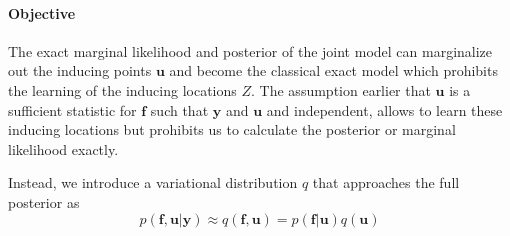 \documentclass[5p,11pt]{article}
\begin{document}
\paragraph{Objective} The exact marginal likelihood and posterior of the joint model can marginalize out the inducing points $\bm{u}$ and become the classical exact model which prohibits the learning of the inducing locations $Z$. The assumption earlier that $\bm{u}$ is a sufficient statistic for $\bm{f}$ such that $\bm{y}$ and $\bm{u}$ and independent, allows to learn these inducing locations but prohibits us to calculate the posterior or marginal likelihood exactly.

Instead, we introduce a variational distribution $q$ that approaches the full posterior as
\begin{equation}
    p(\bm{f},\bm{u}|\bm{y}) \approx q(\bm{f},\bm{u}) = p(\bm{f}|\bm{u}) q(\bm{u})
\end{equation}
\end{document}
